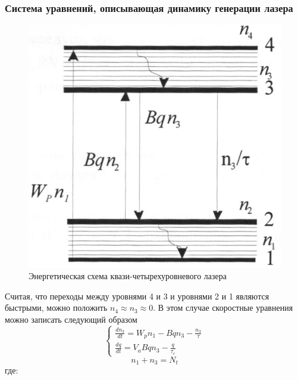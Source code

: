 \documentclass[a4paper, 12pt]{article}
\begin{document}
	\subsubsection{Система уравнений, описывающая динамику генерации лазера}
	\begin{figure}[!htb]
		\centering
		\includegraphics[scale=0.4]{pic2.jpg}
		\caption{Энергетическая схема квази-четырехуровневого лазера}
	\end{figure}
	Считая, что переходы между уровнями 4 и 3 и уровнями 2 и 1 являются быстрыми, можно положить $n_4\approx n_3\approx 0$. В этом случае скоростные уравнения можно записать следующий образом
	\begin{equation}
		\begin{cases}
			\frac{dn_3}{dt}=W_pn_1-Bqn_3-\frac{n_3}{\tau}\\
			\frac{dq}{dt}=V_aBqn_3-\frac{q}{\tau_c}
		\end{cases}
		\label{eq5.1}
	\end{equation}
	\begin{equation*}
		n_1+n_3=N_t
	\end{equation*}
	где:
\end{document}

